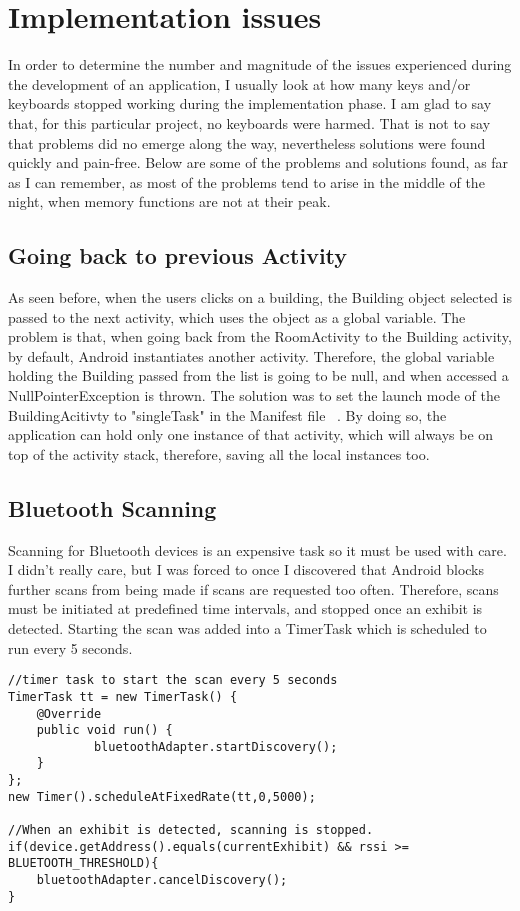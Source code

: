 \section{Implementation issues}
In order to determine the number and magnitude of the issues experienced during the development of an application, I usually look at how many keys and/or keyboards stopped working during the implementation phase. I am glad to say that, for this particular project, no keyboards were harmed. That is not to say that problems did no emerge along the way, nevertheless solutions were found quickly and pain-free. Below are some of the problems and solutions found, as far as I can remember, as most of the problems tend to arise in the middle of the night, when memory functions are not at their peak.

\subsection{Going back to previous Activity}
As seen before, when the users clicks on a building, the Building object selected is passed to the next activity, which uses the object as a global variable. The problem is that, when going back from the RoomActivity to the Building activity, by default, Android instantiates another activity. Therefore, the global variable holding the Building passed from the list is going to be null, and when accessed a NullPointerException is thrown. The solution was to set the launch mode of the BuildingAcitivty to "singleTask" in the Manifest file ~\cite{activity-element}. By doing so, the application can hold only one instance of that activity, which will always be on top of the activity stack, therefore, saving all the local instances too.

\subsection{Bluetooth Scanning}
Scanning for Bluetooth devices is an expensive task so it must be used with care. I didn’t really care, but I was forced to once I discovered that Android blocks further scans from being made if scans are requested too often. Therefore, scans must be initiated at predefined time intervals, and stopped once an exhibit is detected. Starting the scan was added into a TimerTask which is scheduled to run every 5 seconds.
\begin{lstlisting}
//timer task to start the scan every 5 seconds
TimerTask tt = new TimerTask() {
	@Override
    public void run() {
    		bluetoothAdapter.startDiscovery();
    }
};
new Timer().scheduleAtFixedRate(tt,0,5000);
        
//When an exhibit is detected, scanning is stopped.
if(device.getAddress().equals(currentExhibit) && rssi >= BLUETOOTH_THRESHOLD){
	bluetoothAdapter.cancelDiscovery();
}                      
        
\end{lstlisting}

